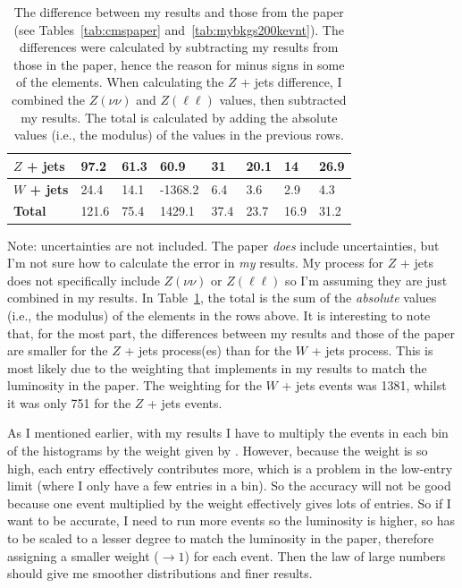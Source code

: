 \begin{table}[H]
\begin{tabular}{|l|lllllll|}
    \textbf{$Z$ + jets}  & 97.2    & 61.3    & 60.9    & 31      & 20.1     & 14        & 26.9    \\ \hline
    \textbf{$W$ + jets} & 24.4    & 14.1    & -1368.2     & 6.4     & 3.6      & 2.9       & 4.3     \\ \hline
    \textbf{Total}        & 121.6 & 75.4  & 1429.1   & 37.4  & 23.7   & 16.9    & 31.2  \\ \hline
    \end{tabular}
    \caption{The difference between my results and those from the paper (see Tables~\ref{tab:cmspaper} and~\ref{tab:mybkgs200kevnt}). The differences were calculated by subtracting my results from those in the paper, hence the reason for minus signs in some of the elements. When calculating the $Z$ + jets difference, I combined the $Z(\nu\nu)$ and $Z(\ell\ell)$ values, then subtracted my results. The total is calculated by adding the absolute values (i.e., the modulus) of the values in the previous rows.}
    \label{tab:diff-mine-cms}
\end{table}

Note: uncertainties are not included. The paper \emph{does} include uncertainties, but I'm not sure how to calculate the error in \emph{my} results. My \madgraph process for $Z$ + jets does not specifically include $Z(\nu\nu)$ or $Z(\ell\ell)$ so I'm assuming they are just combined in my results. In Table~\ref{tab:diff-mine-cms}, the total is the sum of the \emph{absolute} values (i.e., the modulus) of the elements in the rows above. It is interesting to note that, for the most part, the differences between my results and those of the paper are smaller for the $Z$ + jets process(es) than for the $W$ + jets process. This is most likely due to the weighting that \madanalysis implements in my results to match the luminosity in the paper. The weighting for the $W$ + jets events was 1381, whilst it was only 751 for the $Z$ + jets events.

As I mentioned earlier, with my \madgraph results I have to multiply the events in each bin of the histograms by the weight given by \madanalysis. However, because the weight is so high, each entry effectively contributes more, which is a problem in the low-entry limit (where I only have a few entries in a bin). So the accuracy will not be good because one event multiplied by the weight effectively gives lots of entries. So if I want to be accurate, I need to run more events so the luminosity is higher, so has to be scaled to a lesser degree to match the luminosity in the paper, therefore assigning a smaller weight ($\rightarrow 1$) for each event. Then the law of large numbers should give me smoother distributions and finer results.

